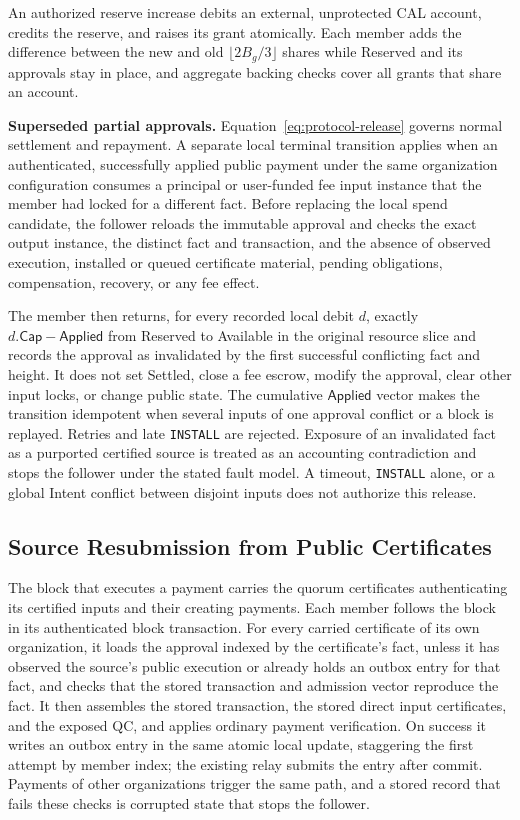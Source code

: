 An authorized reserve increase debits an external, unprotected CAL account, credits the reserve, and raises its grant atomically. Each member adds the difference between the new and old $\lfloor2B_g/3\rfloor$ shares while Reserved and its approvals stay in place, and aggregate backing checks cover all grants that share an account.

\noindent\textbf{Superseded partial approvals.}
Equation~\eqref{eq:protocol-release} governs normal settlement and
repayment.  A separate local terminal transition applies when an
authenticated, successfully applied public payment under the same
organization configuration consumes a principal or user-funded fee
input instance that the member had locked for a different fact.
Before replacing the local spend candidate, the follower reloads the
immutable approval and checks the exact output instance, the distinct
fact and transaction, and the absence of observed execution, installed
or queued certificate material, pending obligations, compensation,
recovery, or any fee effect.

The member then returns, for every recorded local debit $d$, exactly
$d.\mathsf{Cap}-\mathsf{Applied}$ from Reserved to Available in the
original resource slice and records the approval as invalidated by the
first successful conflicting fact and height.  It does not set
\textsf{Settled}, close a fee escrow, modify the approval, clear other
input locks, or change public state.  The cumulative
$\mathsf{Applied}$ vector makes the transition idempotent when several
inputs of one approval conflict or a block is replayed. Retries and late
\texttt{INSTALL} are rejected. Exposure of an invalidated fact as a
purported certified source is treated as an accounting contradiction
and stops the follower under the stated fault model.
A timeout, \texttt{INSTALL} alone, or a global Intent
conflict between disjoint inputs does not authorize this release.

\subsection{Source Resubmission from Public Certificates}
\label{sec:protocol-resubmission}

The block that executes a payment carries the quorum certificates authenticating its certified inputs and their creating payments. Each member follows the block in its authenticated block transaction. For every carried certificate of its own organization, it loads the approval indexed by the certificate's fact, unless it has observed the source's public execution or already holds an outbox entry for that fact, and checks that the stored transaction and admission vector reproduce the fact. It then assembles the stored transaction, the stored direct input certificates, and the exposed QC, and applies ordinary payment verification. On success it writes an outbox entry in the same atomic local update, staggering the first attempt by member index; the existing relay submits the entry after commit. Payments of other organizations trigger the same path, and a stored record that fails these checks is corrupted state that stops the follower.

